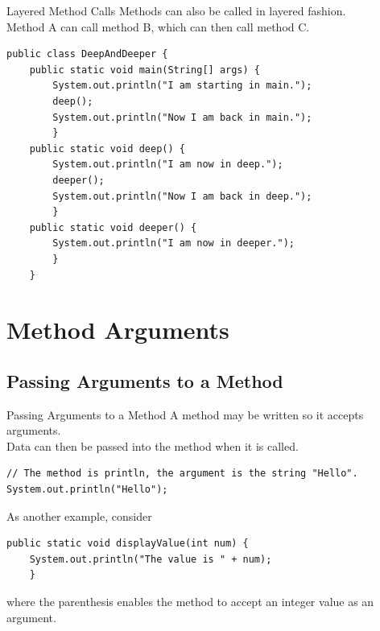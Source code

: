 \documentclass[11pt]{beamer}
\begin{document}
\begin{frame}[fragile]{Layered Method Calls}
Methods can also be called in layered fashion. \\ 
\vspace{1em}
Method A can call method B, which can then call method C.
\begin{lstlisting}[basicstyle=\ttfamily\scriptsize]
public class DeepAndDeeper {
    public static void main(String[] args) {
        System.out.println("I am starting in main.");
        deep();
        System.out.println("Now I am back in main.");
        }
    public static void deep() {
        System.out.println("I am now in deep.");
        deeper();
        System.out.println("Now I am back in deep.");
        }
    public static void deeper() {
        System.out.println("I am now in deeper.");
        }
    }
\end{lstlisting}
\end{frame}

\section{Method Arguments}
\subsection{Passing Arguments to a Method}
\begin{frame}[fragile]{Passing Arguments to a Method}
A method may be written so it accepts arguments. \\ 
\vspace{1em} 
Data can then be passed into the method when it is called.
\begin{lstlisting}
// The method is println, the argument is the string "Hello".
System.out.println("Hello");
\end{lstlisting}
As another example, consider
\begin{lstlisting}
public static void displayValue(int num) {
    System.out.println("The value is " + num); 
    }
\end{lstlisting}
where the parenthesis enables the method to accept an integer value as an argument.
\end{frame}
\end{document}
